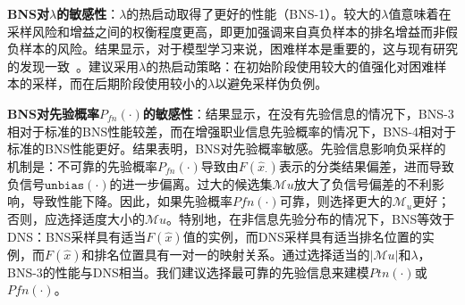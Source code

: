 \begin{table*}[h]
	\centering
	\caption{BNS负采样算法的消融实验}\label{Exp:study}
\end{table*}

\textbf{\textsf{BNS}对$\lambda$的敏感性}：$\lambda$的热启动取得了更好的性能（\textsf{BNS}-1）。较大的$\lambda$值意味着在采样风险和增益之间的权衡程度更高，即更加强调来自真负样本的排名增益而非假负样本的风险。结果显示，对于模型学习来说，困难样本是重要的，这与现有研究的发现一致~\cite{Ding:2020:NIPS,Park:2019:WWW}。建议采用$\lambda$的热启动策略：在初始阶段使用较大的值强化对困难样本的采样，而在后期阶段使用较小的$\lambda$以避免采样伪负例。

\textbf{\textsf{BNS}对先验概率$P_{fn}(\cdot)$的敏感性}：结果显示，在没有先验信息的情况下，\textsf{BNS-3}相对于标准的\textsf{BNS}性能较差，而在增强职业信息先验概率的情况下，\textsf{BNS-4}相对于标准的\textsf{BNS}性能更好。结果表明，\textsf{BNS}对先验概率敏感。先验信息影响负采样的机制是：不可靠的先验概率$P_{fn}(\cdot)$导致由$F(\hat{x}_\cdot)$表示的分类结果偏差，进而导致负信号$\mathtt{unbias}(\cdot)$的进一步偏离。过大的候选集$\mathcal{M}u$放大了负信号偏差的不利影响，导致性能下降。因此，如果先验概率$P{fn}(\cdot)$可靠，则选择更大的$\mathcal{M}_u$更好；否则，应选择适度大小的$\mathcal{M}u$。特别地，在非信息先验分布的情况下，\textsf{BNS}等效于\textsf{DNS}：\textsf{BNS}采样具有适当$F(\hat{x})$值的实例，而\textsf{DNS}采样具有适当排名位置的实例，而$F(\hat{x})$和排名位置具有一对一的映射关系。通过选择适当的$|\mathcal{M}u|$和$\lambda$，\textsf{BNS-3}的性能与\textsf{DNS}相当。我们建议选择最可靠的先验信息来建模$P{tn}(\cdot)$或$P{fn}(\cdot)$。


